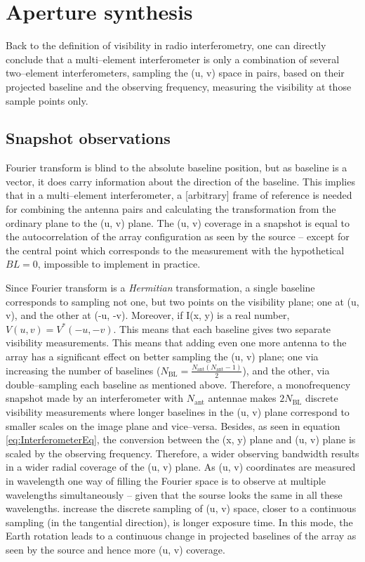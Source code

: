 \documentclass[a4wide,12pt]{book}
\begin{document}
{\section{Aperture synthesis}
Back to the definition of visibility in radio interferometry, one can directly conclude that a multi--element interferometer is only a combination of several two--element interferometers, sampling the (u, v) space in pairs, based on their projected baseline and the observing frequency, measuring the visibility at those sample points only. 

\subsection*{Snapshot observations}
Fourier transform is blind to the absolute baseline position, but as baseline is a vector, it does carry information about the direction of the baseline. This implies that in a multi--element interferometer, a [arbitrary] frame of reference is needed for combining the antenna pairs and calculating the transformation from the ordinary plane to the (u, v) plane. The (u, v) coverage in a snapshot is equal to the autocorrelation of the array configuration as seen by the source -- except for the central point which corresponds to the measurement with the hypothetical $BL = 0$, impossible to implement in practice.

Since Fourier transform is a \emph{Hermitian} transformation, a single baseline corresponds to sampling not one, but two points on the visibility plane; one at (u, v), and the other at (-u, -v). Moreover, if I(x, y) is a real number, $V(u, v) = V^*(-u, -v)$. This means that each baseline gives two separate visibility measurements. This means that adding even one more antenna to the array has a significant effect on better sampling the (u, v) plane; one via increasing the number of baselines ($N_\mathrm{BL} = \frac{N_\mathrm{ant}(N_\mathrm{ant}-1)}{2}$), and the other, via double--sampling each baseline as mentioned above. Therefore, a monofrequency snapshot made by an interferometer with $N_\mathrm{ant}$ antennae makes $2N_\mathrm{BL}$ discrete visibility measurements where longer baselines in the (u, v) plane correspond to smaller scales on the image plane and vice--versa. Besides, as seen in equation \ref{eq:InterferometerEq}, the conversion between the (x, y) plane and (u, v) plane is scaled by the observing frequency. Therefore, a wider observing bandwidth results in a wider radial coverage of the (u, v) plane. As (u, v) coordinates are measured in wavelength one way of filling the Fourier space is to observe at multiple wavelengths simultaneously -- given that the sourse looks the same in all these wavelengths. increase the discrete sampling of (u, v) space, closer to a continuous sampling (in the tangential direction), is longer exposure time. In this mode, the Earth rotation leads to a continuous change in projected baselines of the array as seen by the source and hence more (u, v) coverage.

}
\end{document}
